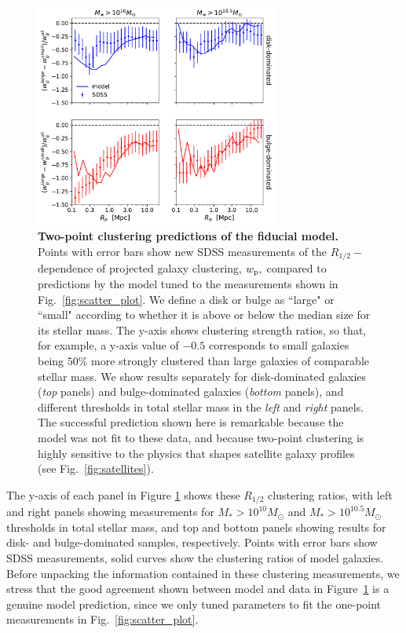 \documentclass[usenatbib,usegraphicx,letterpaper]{mn2e}
\newcommand{\rhalf}{R_{1/2}}
\newcommand{\mstar}{M_{\ast}}
\newcommand{\wproj}{w_{\rm p}}
\begin{document}
\begin{figure}
\centering
\includegraphics[width=8cm]{FIGS/size_clustering_ratios_bt_decomposition_model_vs_sdss.pdf}
\caption{
{\bf Two-point clustering predictions of the fiducial model.}
Points with error bars show new SDSS measurements of the $\rhalf-$dependence of projected galaxy clustering, $\wproj,$ compared to predictions by the model tuned to the measurements shown in Fig.~\ref{fig:scatter_plot}. We define a disk or bulge as ``large" or ``small" according to whether it is above or below the median size for its stellar mass. The y-axis shows clustering strength ratios, so that, for example, a y-axis value of $-0.5$ corresponds to small galaxies being $50\%$ more strongly clustered than large galaxies of comparable stellar mass. We show results separately for disk-dominated galaxies ({\em top} panels) and bulge-dominated galaxies ({\em bottom }panels), and different thresholds in total stellar mass in the {\em left} and {\em right} panels. The successful prediction shown here is remarkable because the model was not fit to these data, and because two-point clustering is highly sensitive to the physics that shapes satellite galaxy profiles (see Fig.~\ref{fig:satellites}).
}
\label{fig:clustering_ratio_upshot}
\end{figure}


The y-axis of each panel in Figure \ref{fig:clustering_ratio_upshot} shows these $\rhalf$ clustering ratios, with left and right panels showing measurements for $\mstar>10^{10}M_{\odot}$ and $\mstar>10^{10.5}M_{\odot}$ thresholds in total stellar mass, and top and bottom panels showing results for disk- and bulge-dominated samples, respectively. Points with error bars show SDSS measurements, solid curves show the clustering ratios of model galaxies. Before unpacking the information contained in these clustering measurements, we stress that the good agreement shown between model and data in Figure~\ref{fig:clustering_ratio_upshot} is a genuine model prediction, since we only tuned parameters to fit the one-point measurements in Fig.~\ref{fig:scatter_plot}.
\end{document}
